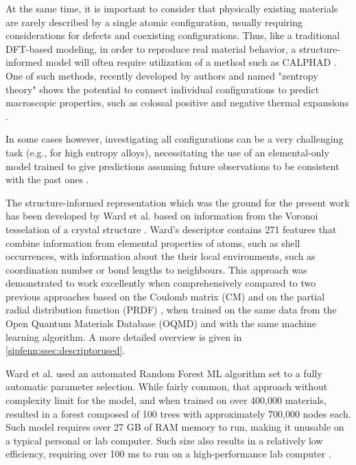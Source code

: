 At the same time, it is important to consider that physically existing materials are rarely described by a single atomic configuration, usually requiring considerations for defects and coexisting configurations. Thus, like a traditional DFT-based modeling, in order to reproduce real material behavior, a structure-informed model will often require utilization of a method such as CALPHAD \cite{Kaufman1970ComputerMetals, Liu2018OceanLearning}. One of such methods, recently developed by authors and named "zentropy theory" shows the potential to connect individual configurations to predict macroscopic properties, such as colossal positive and negative thermal expansions \cite{Liu2021ZentropyExpansions}.

In some cases however, investigating all configurations can be a very challenging task (e.g., for high entropy alloys), necessitating the use of an elemental-only model trained to give predictions assuming future observations to be consistent with the past ones \cite{Debnath2021GenerativeAlloys}. 

\label{sipfenn:ssec:specificapproach}

The structure-informed representation which was the ground for the present work has been developed by Ward et al. based on information from the Voronoi tesselation of a crystal structure \cite{Ward2017IncludingTessellations}. Ward's descriptor contains 271 features that combine information from elemental properties of atoms, such as shell occurrences, with information about the their local environments, such as coordination number or bond lengths to neighbours. This approach was demonstrated to work excellently when comprehensively compared to two previous approaches based on the Coulomb matrix (CM) \cite{Schutt2014HowProperties} and on the partial radial distribution function (PRDF) \cite{Seko2017RepresentationProperties}, when trained on the same data from the Open Quantum Materials Database (OQMD) and with the same machine learning algorithm. A more detailed overview is given in \ref{sipfenn:ssec:descriptorused}.

Ward et al. used an automated Random Forest ML algorithm \cite{Ward2017IncludingTessellations} set to a fully automatic parameter selection. While fairly common, that approach without complexity limit for the model, and when trained on over 400,000 materials, resulted in a forest composed of 100 trees with approximately 700,000 nodes each. Such model requires over 27 GB of RAM memory to run, making it unusable on a typical personal or lab computer. Such size also results in a relatively low efficiency, requiring over 100 ms to run on a high-performance lab computer \cite{Ward2017IncludingTessellations}.


